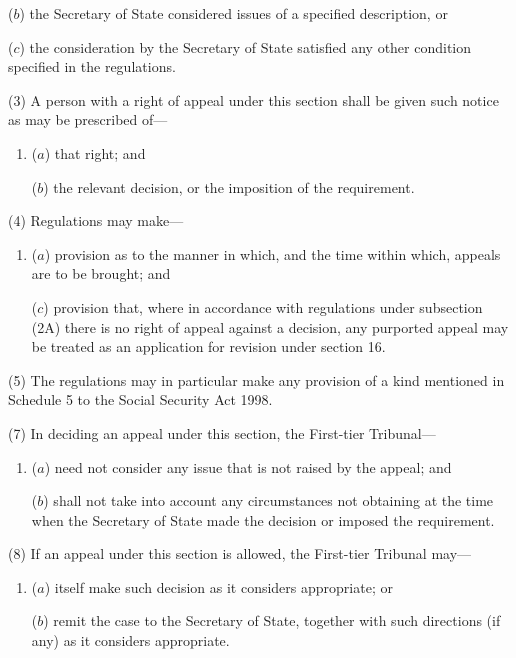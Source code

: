 \documentclass[12pt,a4paper]{article}
\begin{document}
{\begin{enumerate}
($b$) the Secretary of State considered issues of a specified description, or

($c$) the consideration by the Secretary of State satisfied any other condition specified in the regulations.
\end{enumerate}

(3) A person with a right of appeal under this section shall be given such notice as may be prescribed of---
\begin{enumerate}\item[]
($a$) that right; and

($b$) the relevant decision, or the imposition of the requirement.
\end{enumerate}

(4) Regulations may make---
\begin{enumerate}\item[]
($a$) provision as to the manner in which, and the time within which, appeals are to be brought; and

($c$) provision that, where in accordance with regulations under subsection (2A) there is no right of appeal against a decision, any purported appeal may be treated as an application for revision under section 16.
\end{enumerate}

(5)
The regulations may in particular make any provision of a kind mentioned in Schedule 5 to the Social Security Act 1998.

(7) In deciding an appeal under this section, the First-tier Tribunal---
\begin{enumerate}\item[]
($a$) need not consider any issue that is not raised by the appeal; and

($b$) shall not take into account any circumstances not obtaining at the time when the Secretary of State made the decision or imposed the requirement.
\end{enumerate}

(8) If an appeal under this section is allowed, the First-tier Tribunal may---
\begin{enumerate}\item[]
($a$) itself make such decision as it considers appropriate; or

($b$) remit the case to the Secretary of State, together with such directions (if any) as it considers appropriate.
\end{enumerate}


\amendment{

}}
\end{document}
